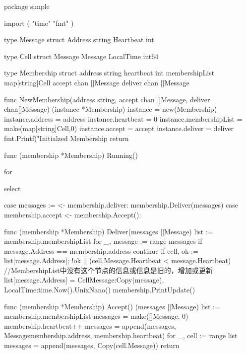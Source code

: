 \begin{codeblock}[language=GO]
    package simple

import (
	"time"
	"fmt"
)

type Message struct {
	Address string
	Heartbeat int
}

type Cell struct {
	Message Message
	LocalTime int64
}

type Membership struct {
	address string
	heartbeat int
	membershipList map[string]Cell
	accept chan []Message
	deliver chan []Message
}

func NewMembership(address string, accept chan []Message, deliver chan[]Message) (instance *Membership){
	instance = new(Membership)
	instance.address = address
	instance.heartbeat = 0
	instance.membershipList = make(map[string]Cell,0)
	instance.accept = accept
	instance.deliver = deliver
	fmt.Printf("Initialzed Membership %
	return
}

func (membership *Membership) Running() {
	for {
		select {
		case messages := <- membership.deliver:
			membership.Deliver(messages)
		case membership.accept <- membership.Accept():

		}
	}
}

func (membership *Membership) Deliver(messages []Message) {
	list := membership.membershipList
	for _, message := range messages {
		if message.Address == membership.address {
			continue
		}
		if cell, ok := list[message.Address]; !ok || (cell.Message.Heartbeat < message.Heartbeat) {
			//MembershipList中没有这个节点的信息或信息是旧的，增加或更新
			list[message.Address] = Cell{Message:Copy(message), LocalTime:time.Now().UnixNano()}
		} 
	}
	membership.PrintUpdate()
}

func (membership *Membership) Accept() (messages []Message) {
	list := membership.membershipList
	messages = make([]Message, 0)
	membership.heartbeat++
	messages = append(messages, Message{membership.address, membership.heartbeat})
	for _, cell := range list {
		messages = append(messages, Copy(cell.Message))
	}
	return
}
\end{codeblock}
